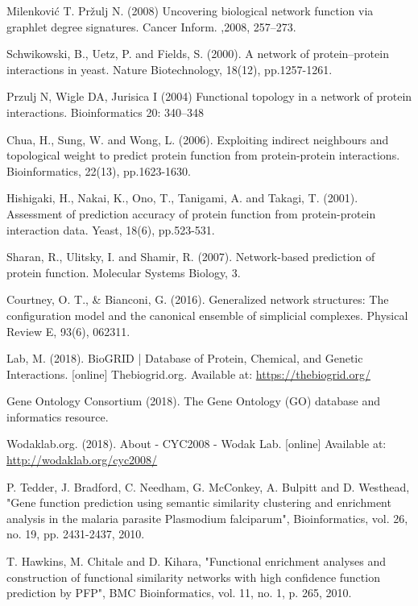 \documentclass[9pt]{article}
\begin{document}
{\begin{thebibliography}{8}
Milenković T. Pržulj N. (2008) Uncovering biological network function via graphlet degree signatures. Cancer Inform. ,2008, 257–273.

Schwikowski, B., Uetz, P. and Fields, S. (2000). A network of protein–protein interactions in yeast. Nature Biotechnology, 18(12), pp.1257-1261.

Przulj N, Wigle DA, Jurisica I (2004) Functional topology in a network of protein interactions. Bioinformatics 20: 340–348

Chua, H., Sung, W. and Wong, L. (2006). Exploiting indirect neighbours and topological weight to predict protein function from protein-protein interactions. Bioinformatics, 22(13), pp.1623-1630.

Hishigaki, H., Nakai, K., Ono, T., Tanigami, A. and Takagi, T. (2001). Assessment of prediction accuracy of protein function from protein-protein interaction data. Yeast, 18(6), pp.523-531.

Sharan, R., Ulitsky, I. and Shamir, R. (2007). Network-based prediction of protein function. Molecular Systems Biology, 3.

Courtney, O. T., \& Bianconi, G. (2016). Generalized network structures: The configuration model and the canonical ensemble of simplicial complexes. Physical Review E, 93(6), 062311. 

Lab, M. (2018). BioGRID | Database of Protein, Chemical, and Genetic Interactions. [online] Thebiogrid.org. Available at: \url{https://thebiogrid.org/}

Gene Ontology Consortium (2018). The Gene Ontology (GO) database and informatics resource.

Wodaklab.org. (2018). About - CYC2008 - Wodak Lab. [online] Available at: \url{http://wodaklab.org/cyc2008/}

P. Tedder, J. Bradford, C. Needham, G. McConkey, A. Bulpitt and D. Westhead, "Gene function prediction using semantic similarity clustering and enrichment analysis in the malaria parasite Plasmodium falciparum", Bioinformatics, vol. 26, no. 19, pp. 2431-2437, 2010.

T. Hawkins, M. Chitale and D. Kihara, "Functional enrichment analyses and construction of functional similarity networks with high confidence function prediction by PFP", BMC Bioinformatics, vol. 11, no. 1, p. 265, 2010.


\end{thebibliography}}
\end{document}
